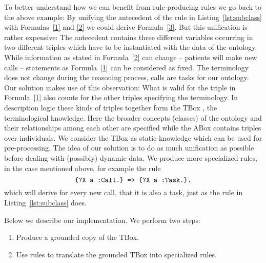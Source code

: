 To better understand how we can benefit from rule-producing rules we go back to the above example: 
By unifying the antecedent of the rule in Listing~\ref{lst:subclass} with Formulas~\ref{1} and \ref{2} we could derive Formula~\ref{3}.
But this unification is rather expensive: The antecedent contains three different variables occurring 
in two different triples which have to be instantiated with the data of the ontology. %
While information as stated in 
Formula~\ref{2} can change -- patients will make new calls -- statements as Formula~\ref{1} can be considered as fixed.
The terminology does not change during the reasoning process,
calls are tasks for our ontology. Our solution makes use of this observation: What is valid for the triple in Formula~\ref{1} also counts for 
the other triples specifying the terminology. In description logic these kinds of triples together form the TBox \cite[chapter 1]{dl}, the terminological knowledge.
Here the broader concepts (classes) of the ontology and their relationships among each other are specified while the ABox contains triples over individuals.
We consider the
TBox as static knowledge which can be used for pre-processing. The idea of our solution is to do as much unification as possible before dealing with (possibly) dynamic data. 
We produce more specialized rules, in the case mentioned above, for example the rule
%
\begin{equation} 
\verb!{?X a :Call.} => {?X a :Task.}.!
\label{4}
\end{equation}
which will derive for every new call, that it is also a task, just as the rule in Listing~\ref{lst:subclass} does.

Below we describe our implementation.
We perform two steps:
\begin{enumerate}
 \item Produce a grounded copy of the  TBox. 
 \item Use rules to translate the grounded TBox into specialized rules.
\end{enumerate}

